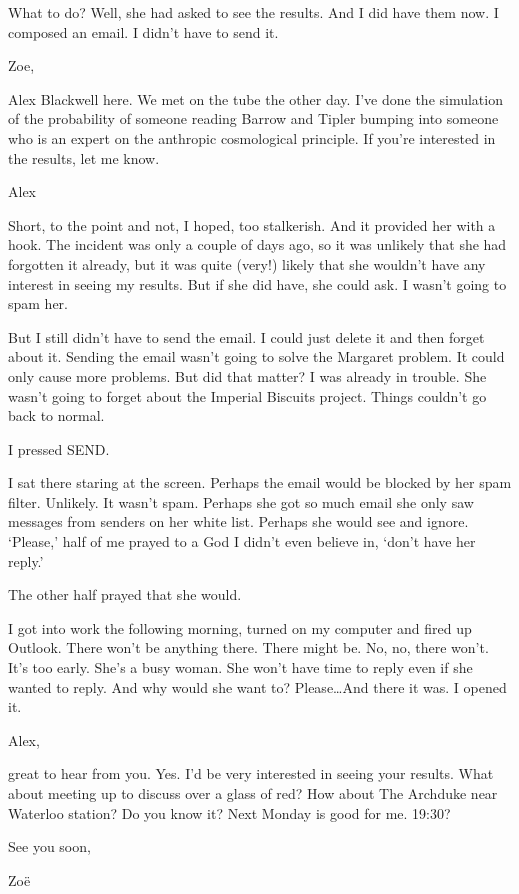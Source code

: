 What to do? Well, she had asked to see the results. And I did have
them now. I composed an email. I didn't have to send it.

{\twelvett \obeylines Zoe,

Alex Blackwell here. We met on the tube the other day. I've done the
simulation of the probability of someone reading Barrow and Tipler
bumping into someone who is an expert on the anthropic cosmological
principle. If you're interested in the results, let me know.

Alex}

Short, to the point and not, I hoped, too stalkerish. And it
provided her with a hook. The incident was only a couple of days
ago, so it was unlikely that she had forgotten it already, but it
was quite (very!) likely that she wouldn't have any interest in
seeing my results. But if she did have, she could ask. I wasn't
going to spam her.

But I still didn't have to send the email. I could just delete it and then
forget about it. Sending the email wasn't going to solve the
Margaret problem. It could only cause more problems. But did that
matter? I was already in trouble. She wasn't going to forget about the Imperial Biscuits project. Things couldn't go back to normal.

I pressed {\twelvett SEND}.

I sat there staring at the screen. Perhaps the email would be
blocked by her spam filter. Unlikely. It wasn't spam. Perhaps she
got so much email she only saw messages from senders on her white
list. Perhaps she would see and ignore. `Please,' half of me prayed
to a God I didn't even believe in, `don't have her reply.'

The other half prayed that she would.

I got into work the following morning, turned on my computer and
fired up Outlook. There won't be anything there. There might be. No,
no, there won't. It's too early. She's a busy woman. She won't have
time to reply even if she wanted to reply. And why would she want
to? Please\dots And there it was. I opened it.

{\twelvett \obeylines
Alex,

great to hear from you. Yes. I'd be very interested in seeing your
results. What about meeting up to discuss over a glass of red? How
about The Archduke near Waterloo station? Do you know it? Next
Monday is good for me. 19:30?

See you soon,

Zoë}

